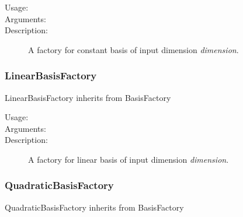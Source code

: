 \begin{description}
\item[Usage:] \rule{0pt}{1em}


\item[Arguments:] \rule{0pt}{1em}

\item[Description:] A factory for constant basis of input dimension \textit{dimension}.


\end{description}
\subsubsection{LinearBasisFactory}

LinearBasisFactory inherits from BasisFactory

\begin{description}
\item[Usage:] \rule{0pt}{1em}


\item[Arguments:] \rule{0pt}{1em}

\item[Description:] A factory for linear basis of input dimension \textit{dimension}.

\end{description}

\subsubsection{QuadraticBasisFactory}

QuadraticBasisFactory inherits from BasisFactory

